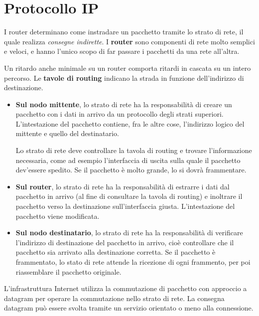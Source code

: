 \section{Protocollo IP}
    
    I router determinano come instradare un pacchetto tramite lo strato di rete, il quale realizza \textit{consegne indirette}. I \textbf{router} sono componenti di rete molto semplici e veloci, e hanno l'unico scopo di far passare i pacchetti da una rete all'altra. 
    
    Un ritardo anche minimale su un router comporta ritardi in cascata su un intero percorso. Le \textbf{tavole di routing} indicano la strada in funzione dell'indirizzo di destinazione. 
    
    
    \begin{itemize}
        \item
            \textbf{ Sul nodo mittente}, lo strato di rete ha la responsabilità di creare un pacchetto con i dati in arrivo da un protocollo degli strati superiori. L'intestazione del pacchetto contiene, fra le altre cose, l'indirizzo logico del mittente e quello del destinatario. 
            
            Lo strato di rete deve controllare la tavola di routing e trovare l'informazione necessaria, come ad esempio l'interfaccia di uscita sulla quale il pacchetto dev'essere spedito. Se il pacchetto è molto grande, lo si dovrà frammentare.
            
        \item
            \textbf{ Sul router}, lo strato di rete ha la responsabilità di estrarre i dati dal pacchetto in arrivo (al fine di consultare la tavola di routing) e inoltrare il pacchetto verso la destinazione sull'interfaccia giusta. L'intestazione del pacchetto viene modificata.
                
        \item
            \textbf{Sul nodo destinatario}, lo strato di rete ha la responsabilità di verificare l'indirizzo di destinazione del pacchetto in arrivo, cioè controllare che il pacchetto sia arrivato alla destinazione corretta. Se il pacchetto è frammentato, lo stato di rete attende la ricezione di ogni frammento, per poi riassemblare il pacchetto originale.
    \end{itemize}
    
    L'infrastruttura Internet utilizza la commutazione di pacchetto con approccio a datagram per operare la commutazione nello strato di rete. La consegna datagram può essere svolta tramite un servizio orientato o meno alla connessione.
    
